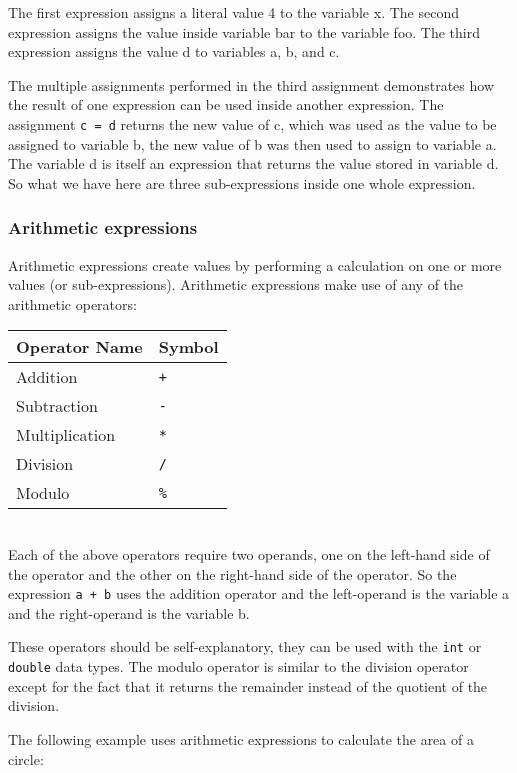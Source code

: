 \documentclass[a4paper,12pt]{article}
\begin{document}
The first expression assigns a literal value 4 to the variable x. The second expression assigns the value inside variable bar to the variable foo. The third expression assigns the value d to variables a, b, and c. 


The multiple assignments performed in the third assignment demonstrates how the result of one expression can be used inside another expression. The assignment \texttt{c = d} returns the new value of c, which was used as the value to be assigned to variable b, the new value of b was then used to assign to variable a. The variable d is itself an expression that returns the value stored in variable d. So what we have here are three sub-expressions inside one whole expression.

\subsubsection*{Arithmetic expressions}

Arithmetic expressions create values by performing a calculation on one or more values (or sub-expressions). Arithmetic expressions make use of any of the arithmetic operators: \\

\begin{tabular}{|l|l|}
\hline
Operator Name & Symbol \\
\hline
Addition & \texttt{+} \\
\hline
Subtraction & \texttt{-} \\
\hline
Multiplication & \texttt{*} \\
\hline
Division & \texttt{/} \\
\hline
Modulo & \texttt{\%} \\
\hline
\end{tabular} \\

Each of the above operators require two operands, one on the left-hand side of the operator and the other on the right-hand side of the operator. So the expression \texttt{a + b} uses the addition operator and the left-operand is the variable a and the right-operand is the variable b.

These operators should be self-explanatory, they can be used with the \texttt{int} or \texttt{double} data types. The modulo operator is similar to the division operator except for the fact that it returns the remainder instead of the quotient of the division. 

The following example uses arithmetic expressions to calculate the area of a circle:
\end{document}
